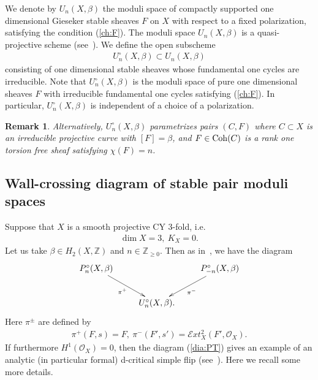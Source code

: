 \documentclass[11pt]{amsart}
\theoremstyle{plain}
\newtheorem{rmk}[thm]{Remark}
\newcommand{\eE}{\mathcal{E}}
\newcommand{\oO}{\mathcal{O}}
\newcommand{\Coh}{\mathop{\rm Coh}\nolimits}
\begin{document}
We denote by $U_n(X, \beta)$
the moduli space of compactly supported 
one dimensional Gieseker stable sheaves $F$ on 
$X$ with respect to a fixed polarization, 
satisfying the condition (\ref{ch:F}).  
The moduli space $U_n(X, \beta)$ is a quasi-projective 
scheme (see~\cite{HL}). We define the 
open subscheme
\begin{align*}
U_n^{\circ}(X, \beta) \subset U_n(X, \beta)
\end{align*}
consisting of one dimensional 
stable sheaves 
whose fundamental one
cycles are irreducible. 
Note that $U_n^{\circ}(X, \beta)$
is the moduli space of pure one dimensional 
sheaves $F$ with irreducible fundamental 
one cycles satisfying (\ref{ch:F}).
In particular, $U_n^{\circ}(X, \beta)$ is independent of a 
choice of a polarization. 
\begin{rmk} 
Alternatively, $U_n^{\circ}(X, \beta)$
parametrizes pairs 
$(C, F)$
where $C \subset X$ is an irreducible projective curve
with $[F]=\beta$, 
and $F \in \Coh(C)$ is a rank one torsion free sheaf
satisfying $\chi(F)=n$. 
\end{rmk}

\subsection{Wall-crossing diagram of stable pair moduli spaces}
\label{subsec:wallpair}
Suppose that $X$ is a smooth projective 
CY 3-fold, i.e. 
\begin{align*}
\dim X=3, \ K_X=0.
\end{align*} 
Let us take $\beta \in H_2(X, \mathbb{Z})$
and $n \in \mathbb{Z}_{\ge 0}$. 
Then as in~\cite{PT3}, we have the diagram
\begin{align}\label{dia:PT}
\xymatrix{
P_n^{\circ}(X, \beta) \ar[rd]_-{\pi^+} & & \ar[ld]^-{\pi^-} 
P_{-n}^{\circ}(X, \beta) \\
& U_n^{\circ}(X, \beta). &
}
\end{align}
Here $\pi^{\pm}$ are defined by
\begin{align*}
\pi^+(F, s)=F, \ 
\pi^-(F', s')=\eE xt^2_X(F', \oO_X). 
\end{align*}
If furthermore $H^1(\oO_X)=0$, 
then the diagram (\ref{dia:PT}) 
gives an example of an
analytic (in particular formal) 
d-critical simple flip 
(see~\cite[Theorem~6.18]{Toddbir}). 
Here we recall some more details. 
\end{document}
